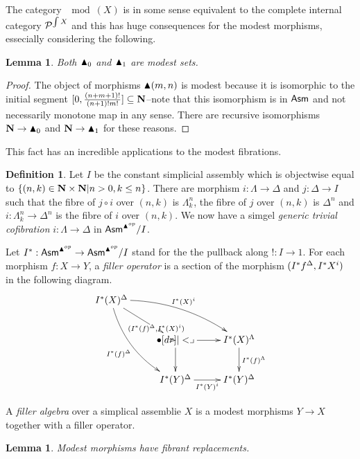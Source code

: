 \documentclass{amsart}
\theoremstyle{plain}
\newtheorem{lemma}[theorem]{Lemma}
\theoremstyle{definition}
\newtheorem{defin}[theorem]{Definition}
\newcommand\cat\mathcal
\newcommand\set[1]{\left\{#1\right\}}
\begin{document}
The category $\mod(X)$ is in some sense equivalent to the complete internal category $\cat P^{\elt X}$ and this has huge consequences for the modest morphisms, essecially considering the following.

\begin{lemma} Both $\blacktriangle_0$ and $\blacktriangle_1$ are modest sets. \end{lemma}

\begin{proof} The object of morphisms $\blacktriangle(m,n)$ is modest because it is isomorphic to the initial segment $[ 0 , \frac{(n+m+1)!}{(n+1)!m!}]\subseteq \mathbf{N}$--note that this isomorphism is in $\mathsf{Asm}$ and not necessarily monotone map in any sense. There are recursive isomorphisms $\mathbf{N} \to \blacktriangle_0$ and $\mathbf{N}\to \blacktriangle_1$ for these reasons. \end{proof}

This fact has an incredible applications to the modest fibrations.

\begin{defin} Let $I$ be the constant simplicial assembly which is objectwise equal to $\set{(n,k)\in \nno\times\nno| n>0, k\leq n}$. There are morphism $i:\Lambda \to \Delta$ and $j:\Delta \to I$ such that the fibre of $j\circ i$ over $(n,k)$ is $\Lambda^n_k$, the fibre of $j$ over $(n,k)$ is $\Delta^n$ and $i:\Lambda^n_k \to \Delta^n$ is the fibre of $i$ over $(n,k)$. We now have a simgel \emph{generic trivial cofibration} $i:\Lambda\to \Delta$ in $\mathsf{Asm}^{\blacktriangle^{op}}/I$.

Let $I^*:\mathsf{Asm}^{\blacktriangle^{op}} \to \mathsf{Asm}^{\blacktriangle^{op}}/I$ stand for the the pullback along $!:I\to 1$. For each morphism $f:X\to Y$, a \emph{filler operator} is a section of the morphism $(I^* f^\Delta,I^* X^i)$ in the following diagram.
\[\xymatrix{ 
I\ri(X)^\Delta \ar@/^3ex/[drr]^{I\ri(X)^i} \ar@/_3ex/[ddr]_{I\ri(f)^\Delta} \ar[dr]|(.7){(I\ri(f)^\Delta,I\ri(X)^i)} \\
& \bullet \ar[d]\ar[r]\pb & I\ri(X)^\Lambda\ar[d]^{I\ri(f)^\Lambda}\\
& I\ri(Y)^\Delta \ar[r]_{I\ri(Y)^i} & I\ri(Y)^\Delta
}\]

A \emph{filler algebra} over a simplical assemblie $X$ is a modest morphisms $Y\to X$ together with a filler operator. 
\end{defin}



\begin{lemma} Modest morphisms have fibrant replacements. \end{lemma}
\end{document}
